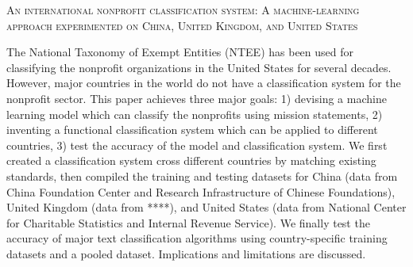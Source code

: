 \documentclass[11pt]{article}
\begin{document}
\begin{center}
{\Large \textsc{An international nonprofit classification system: A machine-learning approach experimented on China, United Kingdom, and United States}}
\end{center}

The National Taxonomy of Exempt Entities (NTEE) has been used for classifying the nonprofit organizations in the United States for several decades. However, major countries in the world do not have a classification system for the nonprofit sector. This paper achieves three major goals: 1) devising a machine learning model which can classify the nonprofits using mission statements, 2) inventing a functional classification system which can be applied to different countries, 3) test the accuracy of the model and classification system. We first created a classification system cross different countries by matching existing standards, then compiled the training and testing datasets for China (data from China Foundation Center and Research Infrastructure of Chinese Foundations), United Kingdom (data from ****), and United States (data from National Center for Charitable Statistics and Internal Revenue Service). We finally test the accuracy of major text classification algorithms using country-specific training datasets and a pooled dataset. Implications and limitations are discussed.
\end{document}
